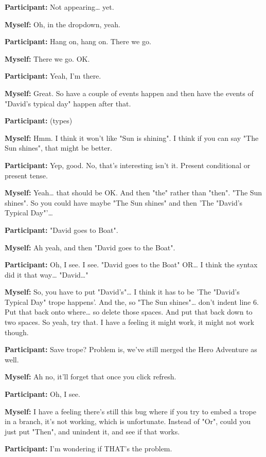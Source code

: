 \documentclass[11pt]{report}
\newcommand{\llabel}[1]{\hypertarget{llineno:#1}{\linelabel{#1}}}
\begin{document}
\begin{linenumbers}
\textbf{Participant:} Not appearing\ldots{} yet.

\textbf{Myself:} Oh, in the dropdown, yeah.

\textbf{Participant:} Hang on, hang on. There we go.

\textbf{Myself:} There we go. OK.

\textbf{Participant:} Yeah, I'm there.

\textbf{Myself:} Great. So have a couple of events happen and then have the events of "David's typical day" happen after that.

\textbf{Participant:} (types)

\textbf{Myself:} Hmm. I think it won't like "Sun is shining". I think if you can
say "The Sun shines", that might be better.\llabel{lne:feature2b}

\textbf{Participant:} Yep, good. No, that's interesting isn't it. Present conditional or present tense.

\textbf{Myself:} Yeah\ldots{} that should be OK. And then "the" rather than "then". "The Sun shines". So you could have maybe "The Sun shines" and then 'The "David's Typical Day"'\ldots{}

\textbf{Participant:} "David goes to Boat".

\textbf{Myself:} Ah yeah, and then "David goes to the Boat".

\textbf{Participant:} Oh, I see. I see. "David goes to the Boat" OR\ldots{} I think the syntax did it that way\ldots{} "David\ldots{}"

\textbf{Myself:} So, you have to put "David's"\ldots{} I think it has to be 'The "David's Typical Day" trope happens'. And the, so "The Sun shines"\ldots{} don't indent line 6. Put that back onto where\ldots{} so delete those spaces. And put that back down to two spaces. So yeah, try that. I have a feeling it might work, it might not work though.

\textbf{Participant:} Save trope? Problem is, we've still merged the Hero Adventure as well.

\textbf{Myself:} Ah no, it'll forget that once you click refresh.

\textbf{Participant:} Oh, I see.

\textbf{Myself:} I have a feeling there's still this bug where if you try to embed a trope in a branch, it's not working, which is unfortunate. Instead of "Or", could you just put "Then", and unindent it, and see if that works.

\textbf{Participant:} I'm wondering if THAT's the problem.


\end{linenumbers}
\end{document}
